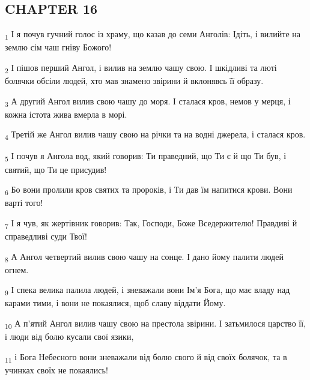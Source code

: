 \subsection{CHAPTER 16}
\begin{tcolorbox}
\textsubscript{1} І я почув гучний голос із храму, що казав до семи Анголів: Ідіть, і вилийте на землю сім чаш гніву Божого!
\end{tcolorbox}
\begin{tcolorbox}
\textsubscript{2} І пішов перший Ангол, і вилив на землю чашу свою. І шкідливі та люті болячки обсіли людей, хто мав знамено звірини й вклонявсь її образу.
\end{tcolorbox}
\begin{tcolorbox}
\textsubscript{3} А другий Ангол вилив свою чашу до моря. І сталася кров, немов у мерця, і кожна істота жива вмерла в морі.
\end{tcolorbox}
\begin{tcolorbox}
\textsubscript{4} Третій же Ангол вилив чашу свою на річки та на водні джерела, і сталася кров.
\end{tcolorbox}
\begin{tcolorbox}
\textsubscript{5} І почув я Ангола вод, який говорив: Ти праведний, що Ти є й що Ти був, і святий, що Ти це присудив!
\end{tcolorbox}
\begin{tcolorbox}
\textsubscript{6} Бо вони пролили кров святих та пророків, і Ти дав їм напитися крови. Вони варті того!
\end{tcolorbox}
\begin{tcolorbox}
\textsubscript{7} І я чув, як жертівник говорив: Так, Господи, Боже Вседержителю! Правдиві й справедливі суди Твої!
\end{tcolorbox}
\begin{tcolorbox}
\textsubscript{8} А Ангол четвертий вилив свою чашу на сонце. І дано йому палити людей огнем.
\end{tcolorbox}
\begin{tcolorbox}
\textsubscript{9} І спека велика палила людей, і зневажали вони Ім'я Бога, що має владу над карами тими, і вони не покаялися, щоб славу віддати Йому.
\end{tcolorbox}
\begin{tcolorbox}
\textsubscript{10} А п'ятий Ангол вилив чашу свою на престола звірини. І затьмилося царство її, і люди від болю кусали свої язики,
\end{tcolorbox}
\begin{tcolorbox}
\textsubscript{11} і Бога Небесного вони зневажали від болю свого й від своїх болячок, та в учинках своїх не покаялись!
\end{tcolorbox}
